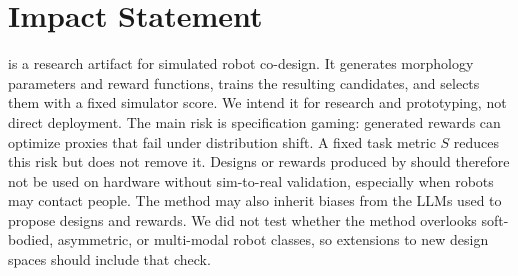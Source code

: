 \section*{Impact Statement}

\method{} is a research artifact for simulated robot co-design. It generates morphology parameters and reward functions, trains the resulting candidates, and selects them with a fixed simulator score. We intend it for research and prototyping, not direct deployment. The main risk is specification gaming: generated rewards can optimize proxies that fail under distribution shift. A fixed task metric $S$ reduces this risk but does not remove it. Designs or rewards produced by \abbrev{} should therefore not be used on hardware without sim-to-real validation, especially when robots may contact people. The method may also inherit biases from the LLMs used to propose designs and rewards. We did not test whether the method overlooks soft-bodied, asymmetric, or multi-modal robot classes, so extensions to new design spaces should include that check.
